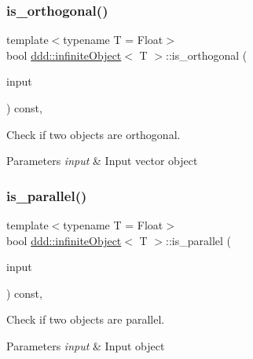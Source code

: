 \subsubsection{\texorpdfstring{is\+\_\+orthogonal()}{is\_orthogonal()}}
{\footnotesize\ttfamily template$<$typename T = Float$>$ \\
bool \hyperlink{classddd_1_1infinite_object}{ddd\+::infinite\+Object}$<$ T $>$\+::is\+\_\+orthogonal (\begin{DoxyParamCaption}\item[{const \hyperlink{classddd_1_1infinite_object}{infinite\+Object}$<$ T $>$ \&}]{input }\end{DoxyParamCaption}) const\hspace{0.3cm}{\ttfamily [inline]}, {\ttfamily [inherited]}}



Check if two objects are orthogonal. 


\begin{DoxyParams}{Parameters}
{\em input} & Input vector object \\
\hline
\end{DoxyParams}
\mbox{\label{classddd_1_1infinite_object_a52c16b849e5bd987c69ed6ae79a6cab1}} 
\subsubsection{\texorpdfstring{is\+\_\+parallel()}{is\_parallel()}}
{\footnotesize\ttfamily template$<$typename T = Float$>$ \\
bool \hyperlink{classddd_1_1infinite_object}{ddd\+::infinite\+Object}$<$ T $>$\+::is\+\_\+parallel (\begin{DoxyParamCaption}\item[{const \hyperlink{classddd_1_1infinite_object}{infinite\+Object}$<$ T $>$ \&}]{input }\end{DoxyParamCaption}) const\hspace{0.3cm}{\ttfamily [inline]}, {\ttfamily [inherited]}}



Check if two objects are parallel. 


\begin{DoxyParams}{Parameters}
{\em input} & Input object \\
\hline
\end{DoxyParams}
\mbox{\label{classddd_1_1infinite_object_a7cd3342d60d4de4e4fc91d90fa9cc065}} 
